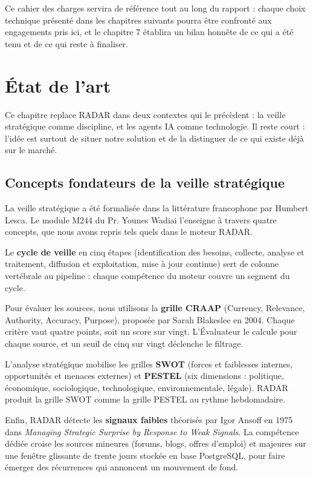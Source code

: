 \documentclass[12pt,a4paper,openany]{report}
\begin{document}
Ce cahier des charges servira de référence tout au long du rapport : chaque choix technique présenté dans les chapitres suivants pourra être confronté aux engagements pris ici, et le chapitre 7 établira un bilan honnête de ce qui a été tenu et de ce qui reste à finaliser.

\chapter{État de l'art}
\label{chap:etat-art}

Ce chapitre replace RADAR dans deux contextes qui le précèdent : la veille stratégique comme discipline, et les agents IA comme technologie. Il reste court : l'idée est surtout de situer notre solution et de la distinguer de ce qui existe déjà sur le marché.

\section{Concepts fondateurs de la veille stratégique}
\label{sec:concepts-veille}

La veille stratégique a été formalisée dans la littérature francophone par Humbert Lesca. Le module M244 du Pr. Younes Wadiai l'enseigne à travers quatre concepts, que nous avons repris tels quels dans le moteur RADAR.

Le \textbf{cycle de veille} en cinq étapes (identification des besoins, collecte, analyse et traitement, diffusion et exploitation, mise à jour continue) sert de colonne vertébrale au pipeline : chaque compétence du moteur couvre un segment du cycle.

Pour évaluer les sources, nous utilisons la \textbf{grille CRAAP} (Currency, Relevance, Authority, Accuracy, Purpose), proposée par Sarah Blakeslee en 2004. Chaque critère vaut quatre points, soit un score sur vingt. L'Évaluateur le calcule pour chaque source, et un seuil de cinq sur vingt déclenche le filtrage.

L'analyse stratégique mobilise les grilles \textbf{SWOT} (forces et faiblesses internes, opportunités et menaces externes) et \textbf{PESTEL} (six dimensions : politique, économique, sociologique, technologique, environnementale, légale). RADAR produit la grille SWOT comme la grille PESTEL au rythme hebdomadaire.

Enfin, RADAR détecte les \textbf{signaux faibles} théorisés par Igor Ansoff en 1975 dans \textit{Managing Strategic Surprise by Response to Weak Signals}. La compétence dédiée croise les sources mineures (forums, blogs, offres d'emploi) et majeures sur une fenêtre glissante de trente jours stockée en base PostgreSQL, pour faire émerger des récurrences qui annoncent un mouvement de fond.
\end{document}
